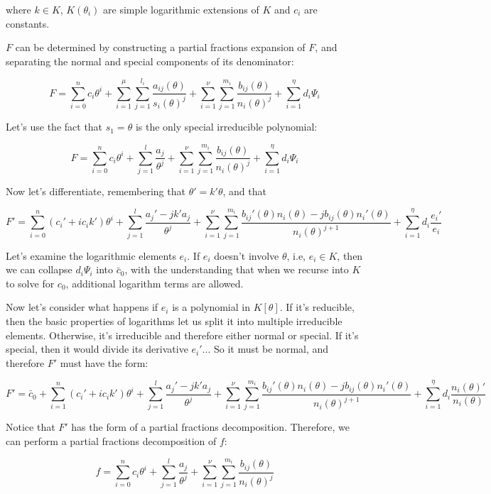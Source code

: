 where $k\in K$, $K(\theta_i)$ are simple logarithmic extensions of $K$ and $c_i$
are constants.

$F$ can be determined by constructing a partial fractions expansion of $F$,
and separating the normal and special components of its denominator:

$$F = \sum_{i=0}^n c_i \theta^i + \sum_{i=1}^\mu \sum_{j=1}^{l_i} \frac{a_{ij}(\theta)}{s_i(\theta)^j}
+ \sum_{i=1}^\nu \sum_{j=1}^{m_i} \frac{b_{ij}(\theta)}{n_i(\theta)^j}
+ \sum_{i=1}^\eta d_i \Psi_i$$

Let's use the fact that $s_1 = \theta$ is the only
special irreducible polynomial:

$$F = \sum_{i=0}^n c_i \theta^i + \sum_{j=1}^{l} \frac{a_{j}}{\theta^j}
+ \sum_{i=1}^\nu \sum_{j=1}^{m_i} \frac{b_{ij}(\theta)}{n_i(\theta)^j}
+ \sum_{i=1}^\eta d_i \Psi_i$$

Now let's differentiate, remembering that $\theta' = k'\theta$, and that 

$$F' = \sum_{i=0}^n (c_i' + i c_i k' )\theta^i
  + \sum_{j=1}^{l} \frac{a_{j}' - j k' a_{j}}{\theta^j}
  + \sum_{i=1}^\nu \sum_{j=1}^{m_i} \frac{b_{ij}'(\theta) n_i(\theta) - j b_{ij}(\theta) n_i'(\theta) }{n_i(\theta)^{j+1}}
  + \sum_{i=1}^\eta d_i \frac{e_i'}{e_i}$$

Let's examine the logarithmic elements $e_i$.  If $e_i$ doesn't involve $\theta$, i.e, $e_i \in K$,
then we can collapse $d_i \Psi_i$ into $\bar{c}_0$, with the understanding that when we recurse
into $K$ to solve for $c_0$, additional logarithm terms are allowed.

Now let's consider what happens if $e_i$ is a polynomial in $K[\theta]$.  If it's reducible, then
the basic properties of logarithms let us split it into multiple irreducible elements.
Otherwise, it's irreducible and therefore either normal or special.  If it's special, then it would
divide its derivative $e_i'$... So it must be normal, and therefore $F'$ must have the form:

$$F' = \bar{c}_0 + \sum_{i=1}^n (c_i' + i c_i k' )\theta^i
  + \sum_{j=1}^{l} \frac{a_{j}' - j k' a_{j}}{\theta^j}
  + \sum_{i=1}^\nu \sum_{j=1}^{m_i} \frac{b_{ij}'(\theta) n_i(\theta) - j b_{ij}(\theta) n_i'(\theta) }{n_i(\theta)^{j+1}}
  + \sum_{i=1}^\eta d_i \frac{n_i(\theta)'}{n_i(\theta)}$$

Notice that $F'$ has the form of a partial fractions decomposition.  Therefore, we can perform
a partial fractions decomposition of $f$:

$$f = \sum_{i=0}^n c_i \theta^i + \sum_{j=1}^{l} \frac{a_{j}}{\theta^j}
+ \sum_{i=1}^\nu \sum_{j=1}^{m_i} \frac{b_{ij}(\theta)}{n_i(\theta)^j}$$

